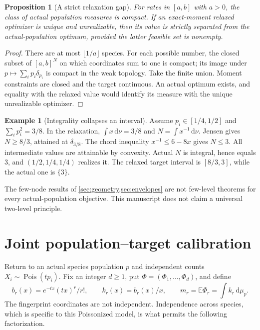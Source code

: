 \documentclass[11pt]{article}
\numberwithin{equation}{section}
\newtheorem{proposition}[proposition]{Proposition}
\theoremstyle{definition}
\newtheorem{example}[example]{Example}
\theoremstyle{remark}
\newcommand{\E}{\mathbb E}
\newcommand{\Pois}{\operatorname{Pois}}
\newcommand{\dd}{\,\mathrm d}
\begin{document}
\begin{proposition}[A strict relaxation gap]\label{prop:relaxgap}
For rates in $[a,b]$ with $a>0$, the class of actual population measures is compact. If an exact-moment relaxed optimizer is unique and unrealizable, then its value is strictly separated from the actual-population optimum, provided the latter feasible set is nonempty.
\end{proposition}
\begin{proof}
There are at most $\lfloor1/a\rfloor$ species. For each possible number, the closed subset of $[a,b]^N$ on which coordinates sum to one is compact; its image under $p\mapsto\sum_i p_i\delta_{p_i}$ is compact in the weak topology. Take the finite union. Moment constraints are closed and the target continuous. An actual optimum exists, and equality with the relaxed value would identify its measure with the unique unrealizable optimizer.
\end{proof}

\begin{example}[Integrality collapses an interval]\label{ex:integergap}
Assume $p_i\in[1/4,1/2]$ and $\sum_i p_i^2=3/8$. In the relaxation, $\int x\dd\nu=3/8$ and $N=\int x^{-1}\dd\nu$. Jensen gives $N\ge8/3$, attained at $\delta_{3/8}$. The chord inequality $x^{-1}\le6-8x$ gives $N\le3$. All intermediate values are attainable by convexity. Actual $N$ is integral, hence equals $3$, and $(1/2,1/4,1/4)$ realizes it. The relaxed target interval is $[8/3,3]$, while the actual one is $\{3\}$.
\end{example}
The few-node results of \cref{sec:geometry,sec:envelopes} are not few-level theorems for every actual-population objective. This manuscript does not claim a universal two-level principle.

\section{Joint population--target calibration}\label{sec:calibration}
Return to an actual species population $p$ and independent counts $X_i\sim\Pois(tp_i)$. Fix an integer $d\ge1$, put $\Phi=(\Phi_1,\ldots,\Phi_d)$, and define
\[
 b_r(x)=e^{-tx}(tx)^r/r!,\qquad k_r(x)=b_r(x)/x,
 \qquad m_r=\E\Phi_r=\int k_r\dd\mu_p.
\]
The fingerprint coordinates are not independent. Independence across species, which is specific to this Poissonized model, is what permits the following factorization.
\end{document}
